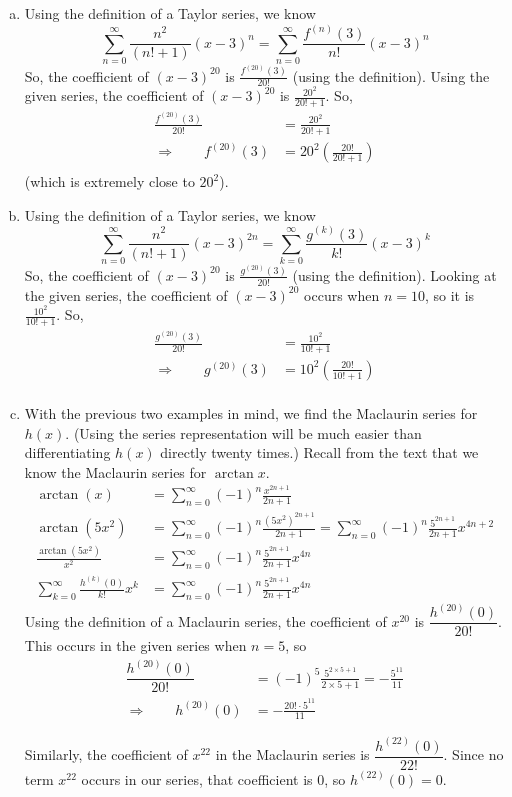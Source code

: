 \begin{solution}
\begin{enumerate}[(a)]
\item
Using the definition of a Taylor series, we know
\[ \displaystyle\sum_{n=0}^\infty \frac{n^2}{(n!+1)}(x-3)^n=\displaystyle\sum_{n=0}^\infty \frac{f^{(n)}(3)}{n!}(x-3)^n\]
So, the coefficient of $(x-3)^{20}$ is  $\frac{f^{(20)}(3)}{20!}$ (using the definition). Using the given series, the coefficient of $(x-3)^{20}$ is $\frac{20^2}{20!+1}$. So,
\begin{align*}
\frac{f^{(20)}(3)}{20!}&=\frac{20^2}{20!+1}\\
\Rightarrow \qquad f^{(20)}(3)&=20^2\left(\frac{20!}{20!+1}\right)\\
\end{align*}
(which is extremely close to $20^2$).

\item
Using the definition of a Taylor series, we know
\[ \displaystyle\sum_{n=0}^\infty \frac{n^2}{(n!+1)}(x-3)^{2n}=\displaystyle\sum_{k=0}^\infty \frac{g^{(k)}(3)}{k!}(x-3)^{k}\]
So, the coefficient of $(x-3)^{20}$ is  $\frac{g^{(20)}(3)}{20!}$ (using the definition). Looking at the given series, the coefficient of $(x-3)^{20}$ occurs when $n=10$, so it is $\frac{10^2}{10!+1}$. So,
\begin{align*}
\frac{g^{(20)}(3)}{20!}&=\frac{10^2}{10!+1}\\
\Rightarrow \qquad g^{(20)}(3)&=10^2\left(\frac{20!}{10!+1}\right)\\
\end{align*}

\item
With the previous two examples in mind, we find the Maclaurin series for $h(x)$. (Using the series representation will be much easier than differentiating $h(x)$ directly twenty times.) Recall from the text that we know the Maclaurin series for $\arctan x$.
\begin{align*}
\arctan(x)&=\sum_{n=0}^\infty (-1)^n\frac{x^{2n+1}}{2n+1}\\
\arctan(5x^2)&=\sum_{n=0}^\infty (-1)^n\frac{{(5x^2)}^{2n+1}}{2n+1}
=\sum_{n=0}^\infty (-1)^n\frac{5^{2n+1}}{2n+1}x^{4n+2}\\
\frac{\arctan(5x^2)}{x^2}&=\sum_{n=0}^\infty (-1)^n\frac{5^{2n+1}}{2n+1}x^{4n}\\
\sum_{k=0}^\infty \frac{h^{(k)}(0)}{k!}x^k&=\sum_{n=0}^\infty (-1)^n\frac{5^{2n+1}}{2n+1}x^{4n}
\end{align*}
Using the definition of a Maclaurin series, the coefficient of $x^{20}$ is $\dfrac{h^{(20)}(0)}{20!}$. This occurs in the given series when $n=5$, so
\begin{align*}
\dfrac{h^{(20)}(0)}{20!}&=(-1)^5\frac{5^{2\times5+1}}{2\times5+1}=-\frac{5^{11}}{11}\\
\Rightarrow\qquad h^{(20)}(0)&=-\frac{20!\cdot 5^{11}}{11}
\end{align*}

Similarly, the coefficient of $x^{22}$ in the Maclaurin series is $\dfrac{h^{(22)}(0)}{22!}$. Since no term $x^{22}$ occurs in our series, that coefficient is 0, so $h^{(22)}(0)=0$.
\end{enumerate}

\end{solution}
